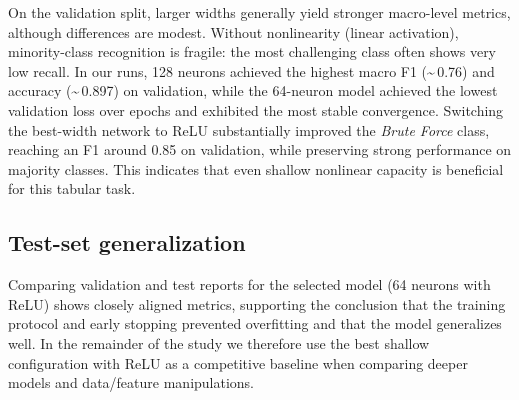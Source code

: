         On the validation split, larger widths generally yield stronger macro-level metrics, although differences are modest. 
        Without nonlinearity (linear activation), minority-class recognition is fragile: the most challenging class often shows very low recall. 
        In our runs, 128 neurons achieved the highest macro F1 (\textasciitilde\,0.76) and accuracy (\textasciitilde\,0.897) on validation, while the 64-neuron model achieved the lowest validation loss over epochs and exhibited the most stable convergence. 
        Switching the best-width network to ReLU substantially improved the \emph{Brute Force} class, reaching an F1 around 0.85 on validation, while preserving strong performance on majority classes. 
        This indicates that even shallow nonlinear capacity is beneficial for this tabular task.

    \subsection{Test-set generalization}

        Comparing validation and test reports for the selected model (64 neurons with ReLU) shows closely aligned metrics, supporting the conclusion that the training protocol and early stopping prevented overfitting and that the model generalizes well. 
        In the remainder of the study we therefore use the best shallow configuration with ReLU as a competitive baseline when comparing deeper models and data/feature manipulations.
